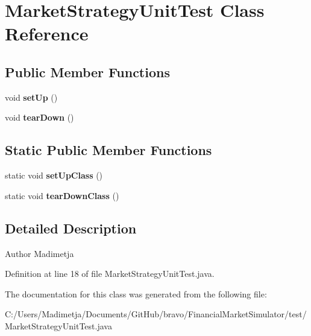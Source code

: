 \hypertarget{class_market_strategy_unit_test}{\section{Market\+Strategy\+Unit\+Test Class Reference}
\label{class_market_strategy_unit_test}
}
\subsection*{Public Member Functions}
\begin{DoxyCompactItemize}
\item 
\hypertarget{class_market_strategy_unit_test_aab34abed7a4e3829160450b21793da17}{void {\bfseries set\+Up} ()}\label{class_market_strategy_unit_test_aab34abed7a4e3829160450b21793da17}

\item 
\hypertarget{class_market_strategy_unit_test_afa4e0a0e8292236fbcf994dc042741fb}{void {\bfseries tear\+Down} ()}\label{class_market_strategy_unit_test_afa4e0a0e8292236fbcf994dc042741fb}

\end{DoxyCompactItemize}
\subsection*{Static Public Member Functions}
\begin{DoxyCompactItemize}
\item 
\hypertarget{class_market_strategy_unit_test_ab6f9926edcaa9511516b0b3bb1025b9f}{static void {\bfseries set\+Up\+Class} ()}\label{class_market_strategy_unit_test_ab6f9926edcaa9511516b0b3bb1025b9f}

\item 
\hypertarget{class_market_strategy_unit_test_aeb485798bfb7f18a04b6355e6f2a2581}{static void {\bfseries tear\+Down\+Class} ()}\label{class_market_strategy_unit_test_aeb485798bfb7f18a04b6355e6f2a2581}

\end{DoxyCompactItemize}


\subsection{Detailed Description}
\begin{DoxyAuthor}{Author}
Madimetja 
\end{DoxyAuthor}


Definition at line 18 of file Market\+Strategy\+Unit\+Test.\+java.



The documentation for this class was generated from the following file\+:\begin{DoxyCompactItemize}
\item 
C\+:/\+Users/\+Madimetja/\+Documents/\+Git\+Hub/bravo/\+Financial\+Market\+Simulator/test/Market\+Strategy\+Unit\+Test.\+java\end{DoxyCompactItemize}
